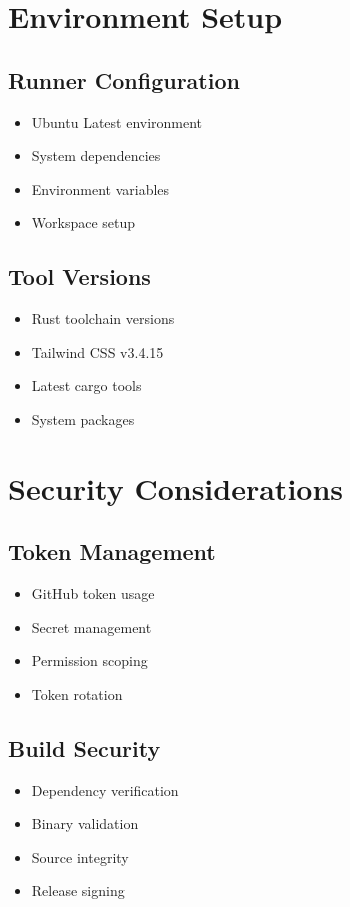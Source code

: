 \documentclass{article}
\begin{document}
\section{Environment Setup}

\subsection{Runner Configuration}
\begin{itemize}
    \item Ubuntu Latest environment
    \item System dependencies
    \item Environment variables
    \item Workspace setup
\end{itemize}

\subsection{Tool Versions}
\begin{itemize}
    \item Rust toolchain versions
    \item Tailwind CSS v3.4.15
    \item Latest cargo tools
    \item System packages
\end{itemize}

\section{Security Considerations}

\subsection{Token Management}
\begin{itemize}
    \item GitHub token usage
    \item Secret management
    \item Permission scoping
    \item Token rotation
\end{itemize}

\subsection{Build Security}
\begin{itemize}
    \item Dependency verification
    \item Binary validation
    \item Source integrity
    \item Release signing
\end{itemize}
\end{document}
